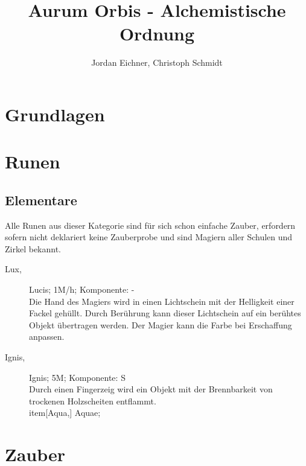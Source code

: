\documentclass[a4paper,12pt,oneside]{book}
\title{Aurum Orbis - Alchemistische Ordnung}
\author{Jordan Eichner, Christoph Schmidt}
\date{}
\begin{document}
\maketitle
\tableofcontents

\part{Grundlagen}

\part{Runen}

\chapter{Elementare}
Alle Runen aus dieser Kategorie sind für sich schon einfache Zauber, erfordern sofern nicht deklariert keine Zauberprobe und sind Magiern aller Schulen und Zirkel bekannt.

\begin{description}
\item[Lux,] Lucis; 1M/h; Komponente: -
\\Die Hand des Magiers wird in einen Lichtschein mit der Helligkeit einer Fackel gehüllt. Durch Berührung kann dieser Lichtschein auf ein berühtes Objekt übertragen werden. Der Magier kann die Farbe bei Erschaffung anpassen.
\item[Ignis,] Ignis; 5M; Komponente: S
\\Durch einen Fingerzeig wird ein Objekt mit der Brennbarkeit von trockenen Holzscheiten entflammt.
\\item[Aqua,] Aquae; 
\end{description}

\part{Zauber}
\end{document}
